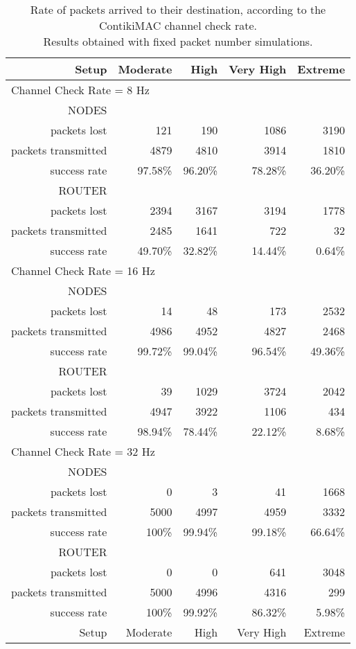 \documentclass[a4paper,twoside]{article}
\begin{document}
\begin{table*}[htbp]
\centering
\begin{tabular}{|r|r|r|r|r|}
\hline
Setup & Moderate & High & Very High & Extreme \\
\hline
\multicolumn{5}{|l|}{Channel Check Rate = 8 Hz}\\
\hline
NODES & & & & \\
packets lost & 121 & 190 & 1086 & 3190 \\
packets transmitted & 4879 & 4810 & 3914 & 1810 \\
success rate & 97.58\% & 96.20\% & 78.28\% & 36.20\% \\
ROUTER & & & & \\
packets lost & 2394 & 3167 & 3194 & 1778 \\
packets transmitted & 2485 & 1641 & 722 & 32 \\
success rate & 49.70\% & 32.82\% & 14.44\% & 0.64\% \\
\hline
\multicolumn{5}{|l|}{Channel Check Rate = 16 Hz}\\
\hline
NODES & & & & \\
packets lost & 14 & 48 & 173 & 2532 \\
packets transmitted & 4986 & 4952 & 4827 & 2468 \\
success rate & 99.72\% & 99.04\% & 96.54\% & 49.36\% \\
ROUTER & & & & \\
packets lost & 39 & 1029 & 3724 & 2042 \\
packets transmitted & 4947 & 3922 & 1106 & 434 \\
success rate & 98.94\% & 78.44\% & 22.12\% & 8.68\% \\
\hline
\multicolumn{5}{|l|}{Channel Check Rate = 32 Hz}\\
\hline
NODES & & & & \\
packets lost & 0 & 3 & 41 & 1668 \\
packets transmitted & 5000 & 4997 & 4959 & 3332 \\
success rate & 100\% & 99.94\% & 99.18\% & 66.64\% \\
ROUTER & & & & \\
packets lost & 0 & 0 & 641 & 3048 \\
packets transmitted & 5000 & 4996 & 4316 & 299 \\
success rate & 100\% & 99.92\% & 86.32\% & 5.98\% \\
\hline
Setup & Moderate & High & Very High & Extreme \\
\hline
\end{tabular}
\caption{Rate of packets arrived to their destination,
         according to the ContikiMAC channel check rate.\\
         Results obtained with fixed packet number simulations.}
\label{TblSuccessRate}
\end{table*}
\end{document}
